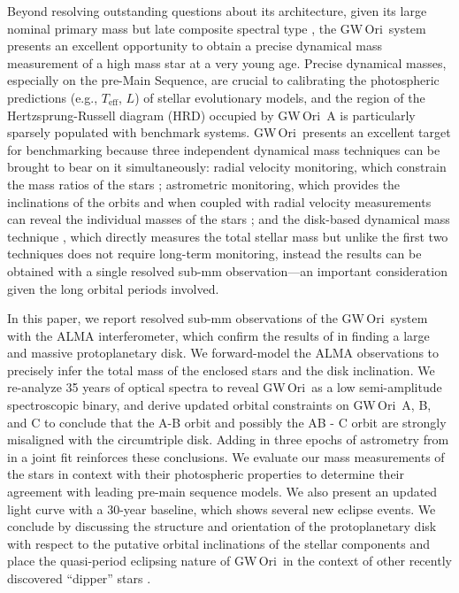 \documentclass[twocolumn]{aastex61}
\newcommand{\todo}[1]{ \textcolor{red}{#1}}
\newcommand{\gw}{GW\,Ori}
\begin{document}
Beyond resolving outstanding questions about its architecture, given its large nominal primary mass but late composite spectral type \citep[$M_\mathrm{A} = 3.9\,M_\odot$, SpT = G8;][]{fang14,fang17}, the \gw\ system presents an excellent opportunity to obtain a precise dynamical mass measurement of a high mass star at a very young age. Precise dynamical masses, especially on the pre-Main Sequence, are crucial to calibrating the photospheric predictions (e.g., $T_\mathrm{eff}$, $L$) of stellar evolutionary models, and the region of the Hertzsprung-Russell diagram (HRD) occupied by \gw~A is particularly sparsely populated with benchmark systems. \gw\ presents an excellent target for benchmarking because three independent dynamical mass techniques can be brought to bear on it simultaneously:
radial velocity monitoring, which constrain the mass ratios of the stars \citep{mathieu91,fang14}; astrometric monitoring, which provides the inclinations of the orbits and when coupled with radial velocity measurements can reveal the individual masses of the stars \citep{berger11};
and the disk-based dynamical mass technique \citep[e.g.,][]{rosenfeld12b,czekala15a,czekala16}, which directly measures the total stellar mass but unlike the first two techniques does not require long-term monitoring, instead the results can be obtained with a single resolved sub-mm observation---an important consideration given the long orbital periods involved.

In this paper, we report resolved sub-mm observations of the \gw\ system with the ALMA interferometer, which confirm the results of \citet{fang17} in finding a large and massive protoplanetary disk. We forward-model the ALMA observations to precisely infer the total mass of the enclosed stars and the disk inclination. We re-analyze 35 years of optical spectra to reveal \gw\ as a low semi-amplitude spectroscopic binary, and derive updated orbital constraints on \gw\ A, B, and C to conclude that the A-B orbit and possibly the AB - C orbit are strongly misaligned with the circumtriple disk. Adding in three epochs of astrometry from \citet{berger11} in a joint fit reinforces these conclusions. We evaluate our mass measurements of the stars in context with their photospheric properties to determine their agreement with leading pre-main sequence models. We also present an updated light curve with a 30-year baseline, which shows several new eclipse events. We conclude by discussing the structure and orientation of the protoplanetary disk with respect to the putative orbital inclinations of the stellar components and place the quasi-period eclipsing nature of \gw\ in the context of other recently discovered ``dipper'' stars \citep[e.g.,][]{ansdell16b,ansdell16a}.
\end{document}
